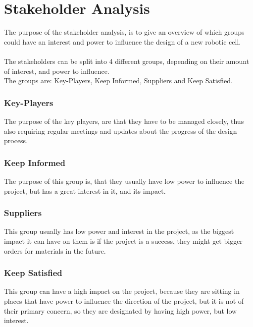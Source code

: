 \chapter{Stakeholder Analysis} \label{ch:Stakeholder Analysis}

The purpose of the stakeholder analysis, is to give an overview of which groups could have an interest and power to influence the design of a new robotic cell.\\
\\

The stakeholders can be split into 4 different groups, depending on their amount of interest, and power to influence.\\
The groups are: Key-Players, Keep Informed, Suppliers and Keep Satisfied.\\


\subsection{Key-Players}
The purpose of the key players, are that they have to be managed closely, thus also requiring regular meetings and updates about the progress of the design process.\\

\subsection{Keep Informed}
The purpose of this group is, that they usually have low power to influence the project, but has a great interest in it, and its impact.\\

\subsection{Suppliers}
This group usually has low power and interest in the project, as the biggest impact it can have on them is if the project is a success, they might get bigger orders for materials in the future.\\

\subsection{Keep Satisfied}
This group can have a high impact on the project, because they are sitting in places that have power to influence the direction of the project, but it is not of their primary concern, so they are designated by having high power, but low interest.\\

